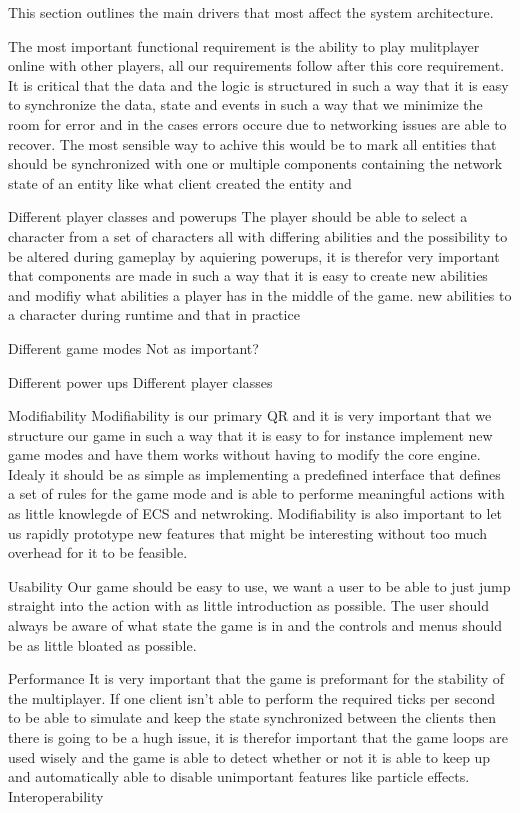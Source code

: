	This section outlines the main drivers that most affect the system architecture.


	The most important functional requirement is the ability to play mulitplayer online with other 
	players, all our requirements follow after this core requirement. It is critical that the data and the logic is
	structured in such a way that it is easy to synchronize the data, state and events in such a way that we minimize the room for error
	and in the cases errors occure due to networking issues are able to recover. The most sensible way to achive this would be to mark all entities
	that should be synchronized with one or multiple components containing the network state of an entity like what client created the entity and

	Different player classes and powerups
	The player should be able to select a character from a set of characters all with differing abilities and the possibility to be altered during gameplay
	by aquiering powerups, it is therefor very important that components are made in such a way that it is easy to create new abilities and modifiy
	what abilities a player has in the middle of the game. new abilities to a character during runtime and that in practice 

	Different game modes
	Not as important?

	Different power ups
	Different player classes

	Modifiability
	Modifiability is our primary QR and it is very important that we structure our game in such a way that it is easy to for instance implement new game modes and have them works without
	having to modify the core engine. Idealy it should be as simple as implementing a predefined interface that defines a set of rules for the game mode and is able to performe meaningful actions with as little
	knowlegde of ECS and netwroking. Modifiability is also important to let us rapidly prototype new features that might be interesting without too much overhead for it to be feasible.
	
	Usability
	Our game should be easy to use, we want a user to be able to just jump straight into the action with as little introduction as possible. The user should always be aware of what state
	the game is in and the controls and menus should be as little bloated as possible.
	
	Performance
	It is very important that the game is preformant for the stability of the multiplayer. If one client isn't able to perform the required ticks per second to be able to simulate
	and keep the state synchronized between the clients then there is going to be a hugh issue, it is therefor important that the game loops are used wisely and the game is able to detect 
	whether or not it is able to keep up and automatically able to disable unimportant features like particle effects.
	Interoperability


